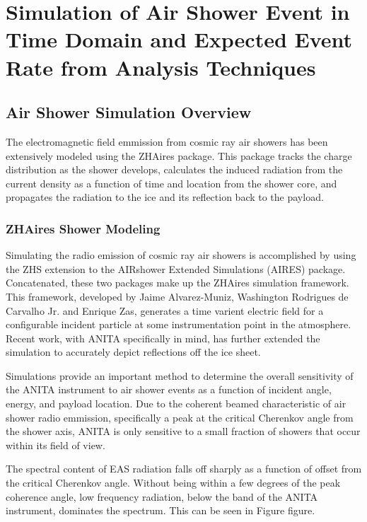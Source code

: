 \chapter{Simulation of Air Shower Event in Time Domain and Expected Event Rate from Analysis Techniques}

\section{Air Shower Simulation Overview}
	The electromagnetic field emmission from cosmic ray air showers has been extensively modeled using the ZHAires package.  This package tracks the charge distribution as the shower develops, calculates the induced radiation from the current density as a function of time and location from the shower core, and propagates the radiation to the ice and its reflection back to the payload.  
	
	\subsection{ZHAires Shower Modeling}
		Simulating the radio emission of cosmic ray air showers is accomplished by using the ZHS extension to the AIRshower Extended Simulations (AIRES) package.\cite{AlvarezMuñiz2012325}  Concatenated, these two packages make up the ZHAires simulation framework.  This framework, developed by Jaime Alvarez-Muniz, Washington Rodrigues de Carvalho Jr. and Enrique Zas, generates a time varient electric field for a configurable incident particle at some instrumentation point in the atmosphere.  Recent work, with ANITA specifically in mind, has further extended the simulation to accurately depict reflections off the ice sheet.
		
		Simulations provide an important method to determine the overall sensitivity of the ANITA instrument to air shower events as a function of incident angle, energy, and payload location.  Due to the coherent beamed characteristic of air shower radio emmission, specifically a peak at the critical Cherenkov angle from the shower axis, ANITA is only sensitive to a small fraction of showers that occur within its field of view.
		
		The spectral content of EAS radiation falls off sharply as a function of offset from the critical Cherenkov angle.  Without being within a few degrees of the peak coherence angle, low frequency radiation, below the band of the ANITA instrument, dominates the spectrum.  This can be seen in Figure figure.  
		
